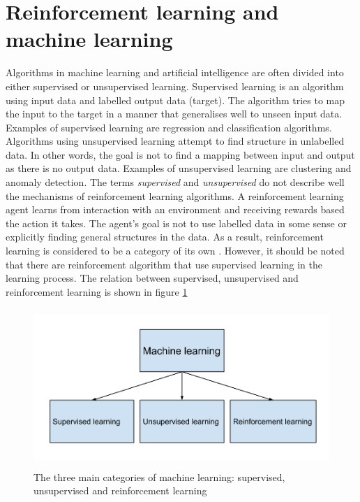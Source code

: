 \documentclass[class=book, crop=false]{standalone}
\begin{document}
\section{Reinforcement learning and machine learning}
Algorithms in machine learning and artificial intelligence are often divided into either supervised or unsupervised learning. Supervised learning is an algorithm using input data and labelled output data (target). The algorithm tries to map the input to the target in a manner that generalises well to unseen input data. Examples of supervised learning are regression and classification algorithms. Algorithms using unsupervised learning attempt to find structure in unlabelled data. In other words, the goal is not to find a mapping between input and output as there is no output data. Examples of unsupervised learning are clustering and anomaly detection. The terms \textit{supervised} and \textit{unsupervised} do not describe well the mechanisms of reinforcement learning algorithms. A reinforcement learning agent learns from interaction with an environment and receiving rewards based the action it takes. The agent's goal is not to use labelled data in some sense or explicitly finding general structures in the data. As a result, reinforcement learning is considered to be a category of its own \cite{Sutton1998}. However, it should be noted that there are reinforcement algorithm that use supervised learning in the learning process. The relation between supervised, unsupervised and reinforcement learning is shown in figure \ref{fig:theory:supervised_vs_rl}


\begin{figure}[ht!]
    \center
    \includegraphics[height=6cm, width=12cm]{figures/supervised_vs_rl.png}
    \caption[size = 9]{The three main categories of machine learning: supervised, unsupervised and reinforcement learning}
    \label{fig:theory:supervised_vs_rl}
\end{figure}
\end{document}
